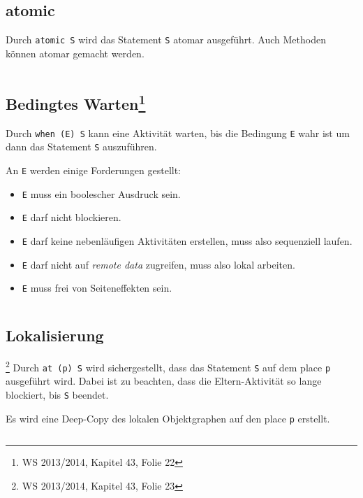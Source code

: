 \subsection{atomic}%
Durch \texttt{atomic S} wird das Statement \texttt{S} atomar ausgeführt. Auch
Methoden können atomar gemacht werden.

\inputminted[numbersep=5pt, tabsize=4]{scala}{scripts/x10/atomic-example.x10}

\subsection[Bedingtes Warten]{Bedingtes Warten\footnote{WS 2013/2014, Kapitel 43, Folie 22}}%
Durch \texttt{when (E) S} kann eine Aktivität warten, bis die Bedingung \texttt{E}
wahr ist um dann das Statement \texttt{S} auszuführen.

An \texttt{E} werden einige Forderungen gestellt:

\begin{itemize}
    \item \texttt{E} muss ein boolescher Ausdruck sein.
    \item \texttt{E} darf nicht blockieren.
    \item \texttt{E} darf keine nebenläufigen Aktivitäten erstellen, muss also
          sequenziell laufen.
    \item \texttt{E} darf nicht auf \textit{remote data} zugreifen, muss also
          lokal arbeiten.
    \item \texttt{E} muss frei von Seiteneffekten sein.
\end{itemize}

\inputminted[numbersep=5pt, tabsize=4]{scala}{scripts/x10/when-example.x10}

\subsection{Lokalisierung}\footnote{WS 2013/2014, Kapitel 43, Folie 23}%
Durch \texttt{at (p) S} wird sichergestellt, dass das Statement \texttt{S} auf
dem place \texttt{p} ausgeführt wird. Dabei ist zu beachten, dass die Eltern-Aktivität
so lange blockiert, bis \texttt{S} beendet.

Es wird eine Deep-Copy des lokalen Objektgraphen auf den place \texttt{p} erstellt.

\inputminted[numbersep=5pt, tabsize=4]{scala}{scripts/x10/at-example.x10}

